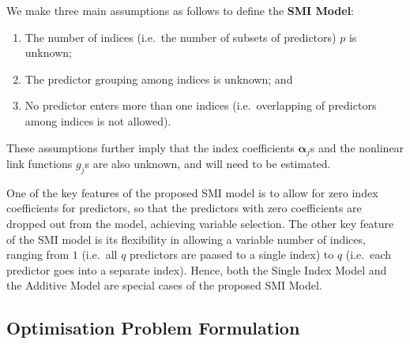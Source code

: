 \documentclass[11pt,a4paper,]{article}
\begin{document}
We make three main assumptions as follows to define the \textbf{SMI
Model}:

\begin{enumerate}
\def\labelenumi{\arabic{enumi}.}
\item
  The number of indices (i.e.~the number of subsets of predictors) \(p\)
  is unknown;
\item
  The predictor grouping among indices is unknown; and
\item
  No predictor enters more than one indices (i.e.~overlapping of
  predictors among indices is not allowed).
\end{enumerate}

These assumptions further imply that the index coefficients
\(\bm{\alpha}_{j}\)s and the nonlinear link functions \(g_{j}\)s are
also unknown, and will need to be estimated.

One of the key features of the proposed SMI model is to allow for zero
index coefficients for predictors, so that the predictors with zero
coefficients are dropped out from the model, achieving variable
selection. The other key feature of the SMI model is its flexibility in
allowing a variable number of indices, ranging from \(1\) (i.e.~all
\(q\) predictors are paased to a single index) to \(q\) (i.e.~each
predictor goes into a separate index). Hence, both the Single Index
Model and the Additive Model are special cases of the proposed SMI
Model.

\hypertarget{optimisation-problem-formulation}{%
\subsection{Optimisation Problem
Formulation}\label{optimisation-problem-formulation}}
\end{document}
